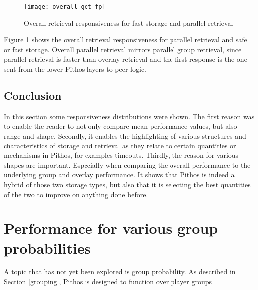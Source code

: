 \begin{figure}[htbp]
 \centering
 \texttt{[image: overall\_get\_fp]}
 \caption{Overall retrieval responsiveness for fast storage and parallel retrieval}
 \label{fig_overall_get_fp}
\end{figure}
%
Figure \ref{fig_overall_get_fp} shows the overall retrieval responsiveness for parallel retrieval and safe or fast storage. Overall parallel retrieval mirrors parallel group retrieval, since parallel retrieval is faster than overlay retrieval and the first response is the one sent from the lower Pithos layers to peer logic. 

\subsection{Conclusion}

In this section some responsiveness distributions were shown. The first reason was to enable the reader to not only compare mean performance values, but also range and shape. Secondly, it enables the highlighting of various structures and characteristics of storage and retrieval as they relate to certain quantities or mechanisms in Pithos, for examples timeouts. Thirdly, the reason for various shapes are important. Especially when comparing the overall performance to the underlying group and overlay performance. It shows that Pithos is indeed a hybrid of those two storage types, but also that it is selecting the best quantities of the two to improve on anything done before.

\section{Performance for various group probabilities}

A topic that has not yet been explored is group probability. As described in Section \ref{grouping}, Pithos is designed to function over player groups

